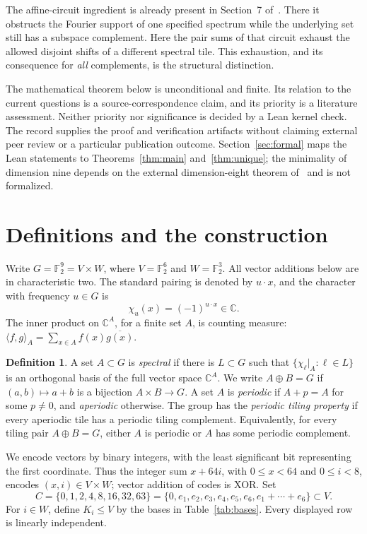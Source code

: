 \documentclass[11pt]{article}
\theoremstyle{definition}\newtheorem{definition}[theorem]{Definition}
\theoremstyle{remark}\newtheorem{remark}[theorem]{Remark}
\newcommand{\F}{\mathbb F}
\newcommand{\C}{\mathbb C}
\newcommand{\pair}[2]{\langle #1,#2\rangle}
\begin{document}
The affine-circuit ingredient is already present in Section~7 of~\cite{fi8}. There it obstructs the Fourier support of one specified spectrum while the underlying set still has a subspace complement. Here the pair sums of that circuit exhaust the allowed disjoint shifts of a different spectral tile. This exhaustion, and its consequence for \emph{all} complements, is the structural distinction.

The mathematical theorem below is unconditional and finite. Its relation to the current questions is a source-correspondence claim, and its priority is a literature assessment. Neither priority nor significance is decided by a Lean kernel check. The record supplies the proof and verification artifacts without claiming external peer review or a particular publication outcome. Section~\ref{sec:formal} maps the Lean statements to Theorems~\ref{thm:main} and~\ref{thm:unique}; the minimality of dimension nine depends on the external dimension-eight theorem of~\cite{fi8} and is not formalized.

\section{Definitions and the construction}

Write $G=\F_2^9=V\times W$, where $V=\F_2^6$ and $W=\F_2^3$. All vector additions below are in characteristic two. The standard pairing is denoted by $u\cdot x$, and the character with frequency $u\in G$ is
\[
\chi_u(x)=(-1)^{u\cdot x}\in\C.
\]
The inner product on $\C^A$, for a finite set $A$, is counting measure:
$\pair fg_A=\sum_{x\in A}f(x)\overline{g(x)}$.

\begin{definition}
A set $A\subset G$ is \emph{spectral} if there is $L\subset G$ such that
$\{\chi_\ell|_A:\ell\in L\}$ is an orthogonal basis of the full vector space $\C^A$.
We write $A\oplus B=G$ if $(a,b)\mapsto a+b$ is a bijection $A\times B\to G$.
A set $A$ is \emph{periodic} if $A+p=A$ for some $p\ne0$, and \emph{aperiodic} otherwise.
The group has the \emph{periodic tiling property} if every aperiodic tile has a periodic tiling complement. Equivalently, for every tiling pair $A\oplus B=G$, either $A$ is periodic or $A$ has some periodic complement.
\end{definition}

We encode vectors by binary integers, with the least significant bit representing the first coordinate. Thus the integer sum $x+64i$, with $0\leq x<64$ and $0\leq i<8$, encodes $(x,i)\in V\times W$; vector addition of codes is XOR. Set
\begin{equation}\label{eq:C}
C=\{0,1,2,4,8,16,32,63\}
 =\{0,e_1,e_2,e_3,e_4,e_5,e_6,e_1+\cdots+e_6\}\subset V.
\end{equation}
For $i\in W$, define $K_i\leq V$ by the bases in Table~\ref{tab:bases}. Every displayed row is linearly independent.
\end{document}

